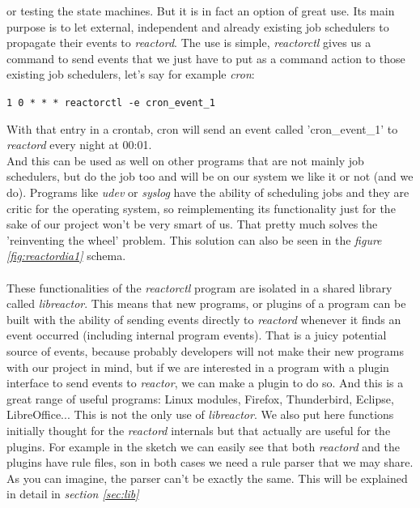 or testing the state machines. But it is in fact an option of great use. Its main purpose is to let external, independent and already 
existing job schedulers to propagate their events to \emph{reactord}. The use is simple, \emph{reactorctl} gives us a command to send 
events that we just have to put as a command action to those existing job schedulers, let's say for example \emph{cron}:\\
\begin{center}
  \texttt{1 0 {*} {*} {*}  reactorctl -e cron\_event\_1}\\
\end{center}
With that entry in a crontab, cron will send an event called 'cron\_event\_1' to \emph{reactord} every night at 00:01.\\
And this can be used as well on other programs that are not mainly job schedulers, but do the job too and will be on our system
we like it or not (and we do). Programs like \emph{udev} or \emph{syslog} have the ability of scheduling jobs and they are critic for the 
operating system, so reimplementing its functionality just for the sake of our project won't be very smart of us. That pretty much solves 
the 'reinventing the wheel' problem. This solution can also be seen in the \emph{figure \ref{fig:reactordia1}} schema.\\
\\
These functionalities of the \emph{reactorctl} program are isolated in a shared library called \emph{libreactor}. This means that new 
programs, or plugins of a program can be built with the ability of sending events directly to \emph{reactord} whenever it finds an event 
occurred (including internal program events). That is a juicy potential source of events, because probably developers will not make their
new programs with our project in mind, but if we are interested in a program with a plugin interface to send events to \emph{reactor}, 
we can make a plugin to do so. And this is a great range of useful programs: Linux modules, Firefox, Thunderbird, Eclipse, LibreOffice...
This is not the only use of \emph{libreactor}. We also put here functions initially thought for the \emph{reactord} internals but that
actually are useful for the plugins. For example in the sketch we can easily see that both \emph{reactord} and the plugins have rule files,
son in both cases we need a rule parser that we may share. As you can imagine, the parser can't be exactly the same. This will be explained
in detail in \emph{section \ref{sec:lib}}\\
\\
